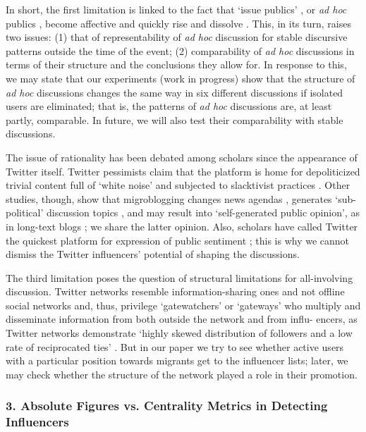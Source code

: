 In short, the first limitation is linked to the fact that ‘issue publics’ \cite[p.~422]{Habermas} \cite[p.~108]{VanDeursenVanDijk}, or \textit{ad hoc} publics \cite{BrunsBurgess}, become affective \cite{Papacharissi} and quickly rise and dissolve \cite[p.~74]{Dahlgren}. This, in its turn, raises two issues: (1) that of representability of \textit{ad hoc} discussion for stable discursive patterns outside the time of the event; (2) comparability of \textit{ad hoc} discussions in terms of their structure and the conclusions they allow for. In response to this, we may state that our experiments (work in progress) show that the structure of \textit{ad hoc} discussions changes the same way in six different discussions if isolated users are eliminated; that is, the patterns of \textit{ad hoc} discussions are, at least partly, comparable. In future, we will also test their comparability with stable discussions.

The issue of rationality has been debated among scholars since the appearance of Twitter itself. Twitter pessimists claim that the platform is home for depoliticized trivial content full of ‘white noise’ \cite{HartleyGreen} and subjected to slacktivist practices \cite{Morozov}. Other studies, though, show that migroblogging changes news agendas \cite{BroersmaGraham}, generates ‘sub-political’ discussion topics \cite{LindgrenLundstrom}, and may result into ‘self-generated public opinion’, as in long-text blogs \cite{KoltsovaKoltcov}; we share the latter opinion. Also, scholars have called Twitter the quickest platform for expression of public sentiment \cite{BrunsBurgessCrawford}; this is why we cannot dismiss the Twitter influencers’ potential of shaping the discussions.

The third limitation poses the question of structural limitations for all-involving discussion. Twitter networks resemble information-sharing ones and not offline social networks \cite[p.~264]{BastosRaimundoTravitzki} and, thus, privilege ‘gatewatchers’ \cite{Bruns} or ‘gateways’ \cite{BastosRaimundoTravitzki} who multiply and disseminate information from both outside the network and from influ- encers, as Twitter networks demonstrate ‘highly skewed distribution of followers and a low rate of reciprocated ties’ \cite[p.~263]{BastosRaimundoTravitzki}. But in our paper we try to see whether active users with a particular position towards migrants get to the influencer lists; later, we may check whether the structure of the network played a role in their promotion.

\subsubsection{3. Absolute Figures vs. Centrality Metrics in Detecting Influencers}

